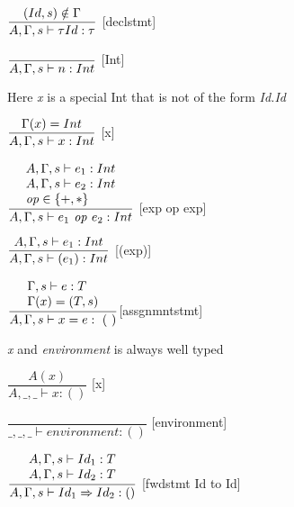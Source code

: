 
\hspace*{10em}
$ \dfrac{(Id, s)\notin \Gamma}{A, \Gamma, s \vdash{} \tau Id : \tau}$ [declstmt]\bigskip

\hspace*{10em}
$ \dfrac{\phantom{}} {A, \Gamma, s \vdash{} n: Int}$ [Int]\bigskip

Here \textit{x} is a special Int that is not of the form
\textit{Id.Id}\bigskip

\hspace*{10em}
$ \dfrac{\Gamma(x)=Int}{A, \Gamma, s \vdash{} x: Int}$ [x]\bigskip

\hspace*{10em}
$\dfrac{
\begin{array}{l}
    A, \Gamma, s \vdash{} e_1 : Int\\
    A, \Gamma, s \vdash{} e_2 : Int\\
    \text{\textit{op}} \in \{+,*\}
\end{array}}
{A, \Gamma, s \vdash{} e_1 \text{\textit{ op }} e_2: Int}$
[exp op exp]\bigskip


\hspace*{10em}
$ \dfrac{A, \Gamma, s \vdash{}e_1:Int}{A, \Gamma, s \vdash{} (e_1): Int}$ [(exp)]\bigskip


\hspace*{10em}
$ \dfrac{
\begin{array}{l}
\Gamma, s \vdash e : T\\
\Gamma (x) = (T,s)
\end{array}}
{A, \Gamma, s \vdash{} x=e:~(~)} $[assgnmntstmt]\bigskip

\textit{x} and \textit{environment} is always well typed\bigskip

\hspace*{10em}
$ \dfrac{A(x)}{A,\_,\_ \vdash x:()}$ [x]\bigskip

\hspace*{10em}
$ \dfrac{\phantom{}}{\_,\_,\_ \vdash environment: ()}$ [environment]\bigskip

\hspace*{10em}
$ \dfrac{
\begin{array}{l}
    A, \Gamma, s \vdash{} Id_1 : T\\
    A, \Gamma, s \vdash{} Id_2 : T\\
\end{array}
}{A, \Gamma, s \vdash{} Id_1 \Rightarrow Id_2 : ()}$ [fwdstmt Id to Id]\bigskip

